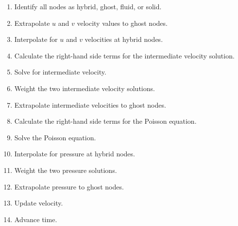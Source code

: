 \begin{enumerate}
	\item Identify all nodes as hybrid, ghost, fluid, or solid. 
	\item Extrapolate $u$ and $v$ velocity values to ghost nodes. 
	\item Interpolate for $u$ and $v$ velocities at hybrid nodes. 
	\item Calculate the right-hand side terms for the intermediate velocity solution. 
	\item Solve for intermediate velocity. 
	\item Weight the two intermediate velocity solutions. 
	\item Extrapolate intermediate velocities to ghost nodes. 
	\item Calculate the right-hand side terms for the Poisson equation. 
	\item Solve the Poisson equation. 
	\item Interpolate for pressure at hybrid nodes. 
	\item Weight the two pressure solutions. 
	\item Extrapolate pressure to ghost nodes. 
	\item Update velocity. 
	\item Advance time. 
\end{enumerate}

